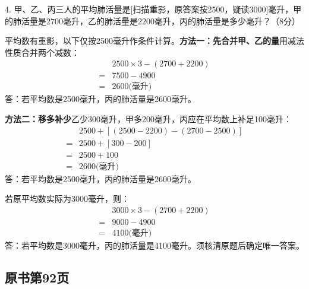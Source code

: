 4. 甲、乙、丙三人的平均肺活量是[扫描重影，原答案按2500，疑读3000]毫升，甲的肺活量是\(2700\)毫升，乙的肺活量是\(2200\)毫升，丙的肺活量是多少毫升？（8分）\par
\begin{BookAnswer}
平均数有重影，以下仅按2500毫升作条件计算。\textbf{方法一：先合并甲、乙的量}用减法性质合并两个减数：\[\begin{aligned}&2500\times3-(2700+2200)\\={}&7500-4900\\={}&2600\text{(毫升)}\end{aligned}\]答：若平均数是2500毫升，丙的肺活量是2600毫升。\par\textbf{方法二：移多补少}乙少300毫升，甲多200毫升，丙应在平均数上补足100毫升：\[\begin{aligned}&2500+[(2500-2200)-(2700-2500)]\\={}&2500+[300-200]\\={}&2500+100\\={}&2600\text{(毫升)}\end{aligned}\]答：若平均数是2500毫升，丙的肺活量是2600毫升。\par 若原平均数实际为3000毫升，则：\[\begin{aligned}&3000\times3-(2700+2200)\\={}&9000-4900\\={}&4100\text{(毫升)}\end{aligned}\]答：若平均数是3000毫升，丙的肺活量是4100毫升。须核清原题后确定唯一答案。
\end{BookAnswer}



\subsection*{原书第92页}

